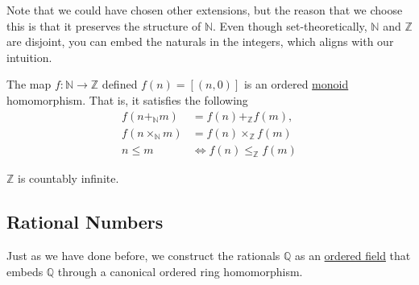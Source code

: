   Note that we could have chosen other extensions, but the reason that we choose this is that it preserves the structure of $\mathbb{N}$. Even though set-theoretically, $\mathbb{N}$ and $\mathbb{Z}$ are disjoint, you can embed the naturals in the integers, which aligns with our intuition. 

  \begin{theorem}
    \label{thm:embedding-of-n-in-z}
    The map $f: \mathbb{N} \rightarrow \mathbb{Z}$ defined $f(n) = [(n, 0)]$ is an ordered \hyperref[def:monoid]{monoid} homomorphism. That is, it satisfies the following
    \begin{align}
      f(n +_{\mathbb{N}} m) & = f(n)+_{\mathbb{Z}}f(m), \\
      f(n \times_{\mathbb{N}} m) & = f(n)\times_{\mathbb{Z}}f(m) \\
      n\leq m & \iff f(n)\leq_{\mathbb{Z}} f(m)
    \end{align}
  \end{theorem}

  \begin{theorem}[Countability]
    \label{thm:countability}
    $\mathbb{Z}$ is countably infinite. 
  \end{theorem}

\subsection{Rational Numbers} 

  Just as we have done before, we construct the rationals $\mathbb{Q}$ as an \hyperref[alg-def:ordered-field]{ordered field} that embeds $\mathbb{Q}$ through a canonical ordered ring homomorphism. 

